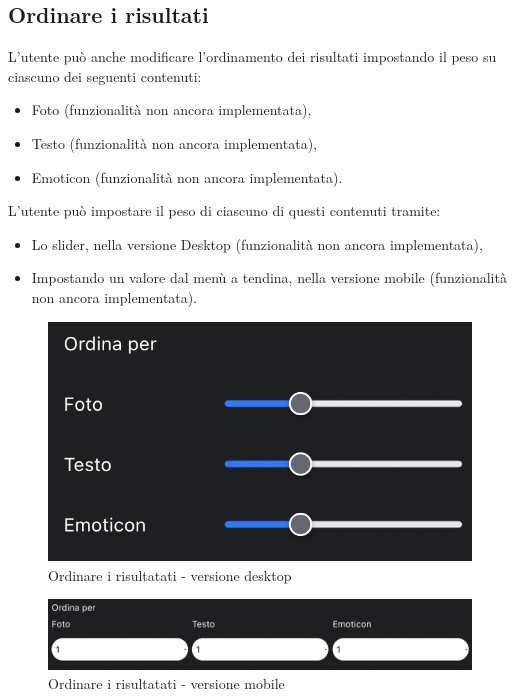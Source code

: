 \subsection{Ordinare i risultati}

L’utente può anche modificare l’ordinamento dei risultati impostando il peso su ciascuno dei seguenti contenuti:

\begin{itemize}
\item Foto (funzionalità non ancora implementata),
\item Testo (funzionalità non ancora implementata),
\item Emoticon (funzionalità non ancora implementata).
\end{itemize}

L’utente può impostare il peso di ciascuno di questi contenuti tramite:

\begin{itemize}
\item Lo slider, nella versione Desktop (funzionalità non ancora implementata), 
\item Impostando un valore dal menù a tendina, nella versione mobile (funzionalità non ancora implementata).
\end{itemize}

\begin{figure}[H]
\centering
\includegraphics[scale=0.4]{./images/Ricerca/Ordina.png} 
\caption{Ordinare i risultatati - versione desktop}
\end{figure}

\begin{figure}[H]
\centering
\includegraphics[scale=0.4]{./images/Ricerca/OrdinaMobile.png} 
\caption{Ordinare i risultatati - versione mobile}
\end{figure}


